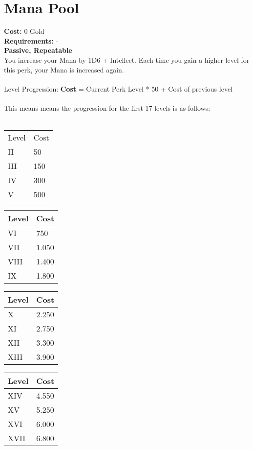 \section{Mana Pool}\label{sec:manapool}
\textbf{Cost:} 0 Gold\\
\textbf{Requirements:} -\\
\textbf{Passive, Repeatable}\\
You increase your Mana by 1D6 + Intellect.
Each time you gain a higher level for this perk, your Mana is increased again.\\
\\
Level Progression: \textbf{Cost} = Current Perk Level * 50 + Cost of previous level\\
\\
This means means the progression for the first 17 levels is as follows:\\
\\
\begin{minipage}{0.25\textwidth}
    \begin{tabular}{l | l}
        Level & Cost\\
        II & 50\\
        III & 150\\
        IV & 300\\
        V & 500\\
    \end{tabular}
\end{minipage}
\begin{minipage}{0.25\textwidth}
    \begin{tabular}{l | l}
        Level & Cost\\ \hline
        VI & 750\\
        VII & 1.050\\
        VIII & 1.400\\
        IX & 1.800\\
    \end{tabular}
\end{minipage}
\begin{minipage}{0.25\textwidth}
    \begin{tabular}{l | l}
        Level & Cost\\ \hline
        X & 2.250\\
        XI & 2.750\\
        XII & 3.300\\
        XIII & 3.900\\
    \end{tabular}
\end{minipage}
\begin{minipage}{0.25\textwidth}
    \begin{tabular}{l | l}
        Level & Cost\\ \hline
        XIV & 4.550\\
        XV & 5.250\\
        XVI & 6.000\\
        XVII & 6.800\\
    \end{tabular}
\end{minipage}